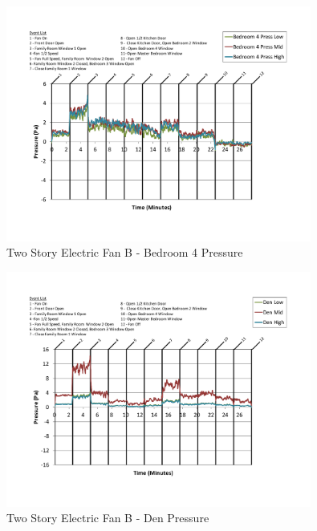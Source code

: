\documentclass{article}
\begin{document}
\begin{appendices}
	\begin{figure}[H]
		\centering
		\includegraphics[height=3.05in,trim=0.67in 1.1in 0.67in 0.8in,clip=true]{0_Images/Results_Charts/ColdFlow/Two_Story/Electric/B/Bedroom_4_Pressure.pdf}
		\caption{Two Story Electric Fan B - Bedroom 4 Pressure}
	\end{figure}
 

	\begin{figure}[H]
		\centering
		\includegraphics[height=3.05in,trim=0.67in 1.1in 0.67in 0.8in,clip=true]{0_Images/Results_Charts/ColdFlow/Two_Story/Electric/B/Den_Pressure.pdf}
		\caption{Two Story Electric Fan B - Den Pressure}
	\end{figure}
 
	\clearpage


\end{appendices}
\end{document}
